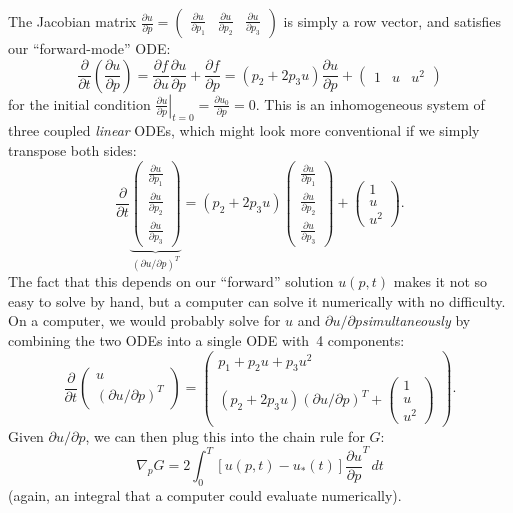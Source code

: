 The Jacobian matrix $\frac{\partial u}{\partial p}=\left(\begin{array}{ccc}
\frac{\partial u}{\partial p_{1}} & \frac{\partial u}{\partial p_{2}} & \frac{\partial u}{\partial p_{3}}\end{array}\right)$ is simply a row vector, and satisfies our ``forward-mode'' ODE:
\[
\frac{\partial}{\partial t}\left(\frac{\partial u}{\partial p}\right)=\frac{\partial f}{\partial u}\frac{\partial u}{\partial p}+\frac{\partial f}{\partial p}=\left(p_{2}+2p_{3}u\right)\frac{\partial u}{\partial p}+\left(\begin{array}{ccc}
1 & u & u^{2}\end{array}\right)
\]
for the initial condition $\left.\frac{\partial u}{\partial p}\right|_{t=0}=\frac{\partial u_{0}}{\partial p}=0$.
This is an inhomogeneous system of three coupled \emph{linear} ODEs,
which might look more conventional if we simply transpose both sides:
\[
\frac{\partial}{\partial t}\underbrace{\left(\begin{array}{c}
\frac{\partial u}{\partial p_{1}}\\
\frac{\partial u}{\partial p_{2}}\\
\frac{\partial u}{\partial p_{3}}
\end{array}\right)}_{(\partial u/\partial p)^{T}}=\left(p_{2}+2p_{3}u\right)\left(\begin{array}{c}
\frac{\partial u}{\partial p_{1}}\\
\frac{\partial u}{\partial p_{2}}\\
\frac{\partial u}{\partial p_{3}}
\end{array}\right)+\left(\begin{array}{c}
1\\
u\\
u^{2}
\end{array}\right).
\]
The fact that this depends on our ``forward'' solution $u(p,t)$
makes it not so easy to solve by hand, but a computer can solve it numerically
with no difficulty.  On a computer, we would probably solve for $u$ and $\partial u/ \partial p$\emph{simultaneously} by combining the two ODEs into a single ODE with~4 components:
\[
\frac{\partial}{\partial t}\left(\begin{array}{c}
u \\
(\partial u/\partial p)^{T}
\end{array}\right) =
\left(\begin{array}{c}
p_{1}+p_{2}u+p_{3}u^{2} \\
\left(p_{2}+2p_{3}u\right) (\partial u/\partial p)^{T} +\left(\begin{array}{c}
1\\
u\\
u^{2}
\end{array}\right)
\end{array}\right).
\]
Given $\partial u/\partial p$, we can then plug this into the chain rule for
$G$:
\[
\nabla_{p}G=2\int_{0}^{T}\left[u(p,t)-u_{*}(t)\right]\frac{\partial u}{\partial p}^{T}\,dt
\]
(again, an integral that a computer could evaluate numerically).


